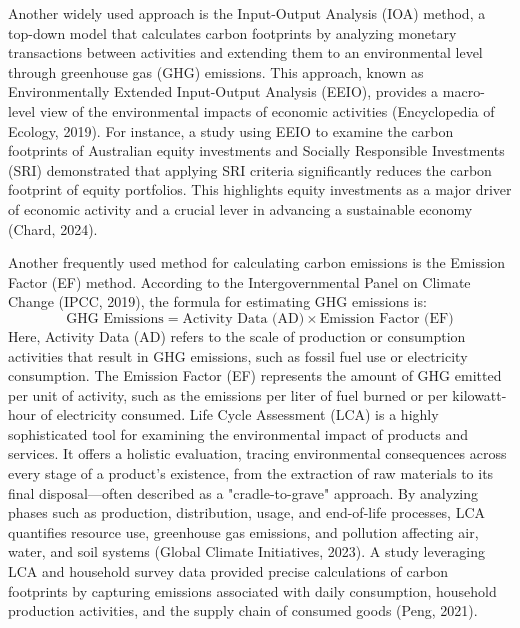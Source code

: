 \documentclass[12pt,a4paper]{article}%
\begin{document}
Another widely used approach is the Input-Output Analysis (IOA) method, a top-down model that calculates carbon footprints by analyzing monetary transactions between activities and extending them to an environmental level through greenhouse gas (GHG) emissions. This approach, known as Environmentally Extended Input-Output Analysis (EEIO), provides a macro-level view of the environmental impacts of economic activities (Encyclopedia of Ecology, 2019). For instance, a study using EEIO to examine the carbon footprints of Australian equity investments and Socially Responsible Investments (SRI) demonstrated that applying SRI criteria significantly reduces the carbon footprint of equity portfolios. This highlights equity investments as a major driver of economic activity and a crucial lever in advancing a sustainable economy (Chard, 2024).
\vspace{5pt}

Another frequently used method for calculating carbon emissions is the Emission Factor (EF) method. According to the Intergovernmental Panel on Climate Change (IPCC, 2019), the formula for estimating GHG emissions is:
\[
\text{GHG Emissions} = \text{Activity Data (AD)} \times \text{Emission Factor (EF)}
\]
Here, Activity Data (AD) refers to the scale of production or consumption activities that result in GHG emissions, such as fossil fuel use or electricity consumption. The Emission Factor (EF) represents the amount of GHG emitted per unit of activity, such as the emissions per liter of fuel burned or per kilowatt-hour of electricity consumed. Life Cycle Assessment (LCA) is a highly sophisticated tool for examining the environmental impact of products and services. It offers a holistic evaluation, tracing environmental consequences across every stage of a product's existence, from the extraction of raw materials to its final disposal—often described as a "cradle-to-grave" approach. By analyzing phases such as production, distribution, usage, and end-of-life processes, LCA quantifies resource use, greenhouse gas emissions, and pollution affecting air, water, and soil systems (Global Climate Initiatives, 2023). A study leveraging LCA and household survey data provided precise calculations of carbon footprints by capturing emissions associated with daily consumption, household production activities, and the supply chain of consumed goods (Peng, 2021).

\vspace{5pt}
\end{document}
